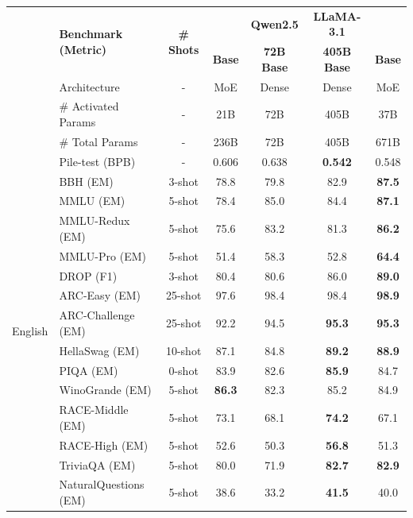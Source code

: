 \begin{table}[!ht]
    \centering
    \footnotesize
    \setlength{\tabcolsep}{4.5pt}
    \begin{tabular}{@{}c l c | c | c c | c@{}}
    \toprule
    & \multirow{2}{*}{\centering \textbf{Benchmark {\tiny (Metric)}}} & \multirow{2}{*}{\textbf{\# Shots}} & \textbf{\dsvii{}} & \textbf{Qwen2.5} & \textbf{LLaMA-3.1} & \textbf{\dsviii{}} \\
    & & & \textbf{Base} & \textbf{72B Base} & \textbf{405B Base} & \textbf{Base} \\
    \midrule
    & Architecture & - & MoE & Dense & Dense & MoE \\
    & \# Activated Params & - & 21B & 72B & 405B & 37B \\
    & \# Total Params & - & 236B & 72B & 405B & 671B \\
    \midrule
    \multirow{16}{*}{English} & Pile-test {\tiny (BPB)} & - & 0.606 & 0.638 & \textbf{0.542} & 0.548 \\
    & BBH {\tiny (EM)} & 3-shot & 78.8 & 79.8 & 82.9 & \textbf{87.5} \\
    & MMLU {\tiny (EM)} & 5-shot & 78.4 & 85.0 & 84.4 & \textbf{87.1} \\
    & MMLU-Redux {\tiny (EM)} & 5-shot & 75.6 & 83.2 & 81.3 & \textbf{86.2} \\
    & MMLU-Pro {\tiny (EM)} & 5-shot & 51.4 & 58.3 & 52.8 & \textbf{64.4} \\
    & DROP {\tiny (F1)} & 3-shot & 80.4 & 80.6 & 86.0 & \textbf{89.0} \\
    & ARC-Easy {\tiny (EM)} & 25-shot & 97.6 & 98.4 & 98.4 & \textbf{98.9} \\
    & ARC-Challenge {\tiny (EM)} & 25-shot & 92.2 & 94.5 & \textbf{95.3} & \textbf{95.3} \\
    & HellaSwag {\tiny (EM)} & 10-shot & 87.1 & 84.8 & \textbf{89.2} & \textbf{88.9} \\
    & PIQA {\tiny (EM)} & 0-shot & 83.9 & 82.6 & \textbf{85.9} & 84.7 \\
    & WinoGrande {\tiny (EM)} & 5-shot & \textbf{86.3} & 82.3 & 85.2 & 84.9 \\
    & RACE-Middle {\tiny (EM)} & 5-shot & 73.1 & 68.1 & \textbf{74.2} & 67.1 \\
    & RACE-High {\tiny (EM)} & 5-shot & 52.6 & 50.3 & \textbf{56.8} & 51.3 \\
    & TriviaQA {\tiny (EM)} & 5-shot & 80.0 & 71.9 & \textbf{82.7} & \textbf{82.9} \\
    & NaturalQuestions {\tiny (EM)} & 5-shot & 38.6 & 33.2 & \textbf{41.5} & 40.0 \\

\end{tabular}
\end{table}
